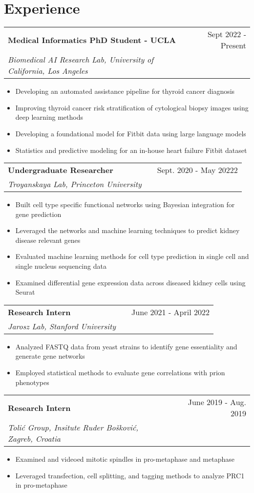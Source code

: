 \documentclass[a4paper,12pt]{article}
\makeatletter
\newenvironment{joblong}[3]
    {
    \begin{tabularx}{\linewidth}{@{}l X r@{}}
    \textbf{#1} & \hfill &  #2 \\
    \textit{#3} & & \\[3.75pt]  
    \end{tabularx}
    \begin{minipage}[t]{\linewidth}
    \begin{itemize}[nosep,after=\strut, leftmargin=1em, itemsep=3pt,label=\scriptsize$\bullet$]
    }
    {
    \end{itemize}
    \end{minipage}    
    }
\makeatother
\begin{document}
\section{Experience}

\begin{joblong}{Medical Informatics PhD Student - UCLA}{Sept 2022 - Present}{Biomedical AI Research Lab, University of California, Los Angeles}
\item Developing an automated assistance pipeline for thyroid cancer diagnosis 
\item Improving thyroid cancer risk stratification of cytological biopsy images using deep learning methods
\item Developing a foundational model for Fitbit data using large language models 
\item Statistics and predictive modeling for an in-house heart failure Fitbit dataset
\end{joblong}

\begin{joblong}{Undergraduate Researcher}{Sept. 2020 - May 20222}{Troyanskaya Lab, Princeton University}
\item Built cell type specific functional networks using Bayesian integration for gene prediction
\item Leveraged the networks and machine learning techniques to predict kidney disease relevant genes
\item Evaluated machine learning methods for cell type prediction in single cell and single nucleus sequencing data
\item Examined differential gene expression data across diseased kidney cells using Seurat
\end{joblong}



\begin{joblong}{Research Intern}{June 2021 - April 2022}{Jarosz Lab, Stanford University}
\item Analyzed FASTQ data from yeast strains to identify gene essentiality and generate gene networks
\item Employed statistical methods to evaluate gene correlations with prion phenotypes
\end{joblong}

\begin{joblong}{Research Intern}{June 2019 - Aug. 2019}{Tolić Group, Insitute Ruder Bošković, Zagreb, Croatia}
\item Examined and videoed mitotic spindles in pro-metaphase and metaphase
\item Leveraged transfection, cell splitting, and tagging methods to analyze PRC1 in pro-metaphase
\end{joblong}
\end{document}
